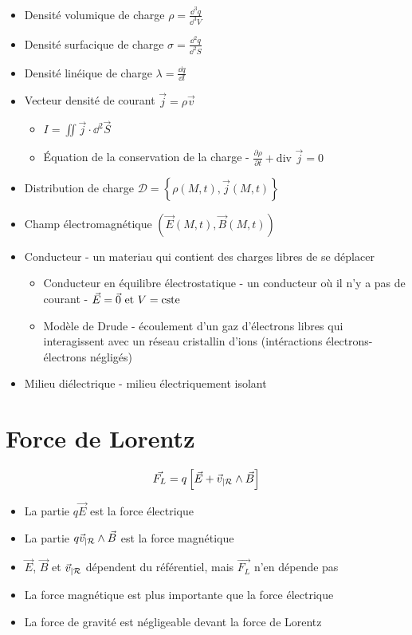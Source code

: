 \documentclass[openany]{book}
\begin{document}
\begin{itemize}
    \item Densité volumique de charge $\rho = \frac{\dd^3 q}{\dd^3 V}$
    \item Densité surfacique de charge $\sigma = \frac{\dd^2 q}{\dd^2 S}$
    \item Densité linéique de charge $\lambda = \frac{\dd q}{\dd l}$
    \item Vecteur densité de courant $\vec{j} = \rho \vec{v}$ 
    \begin{itemize}
        \item $I = \iint \vec{j} \cdot \dd^2 \vec{S}$
        \item Équation de la conservation de la charge - $\frac{\partial \rho}{\partial t} + \text{div }\vec{j} = 0$
    \end{itemize}
    \item Distribution de charge $\mathcal{D} = \left\{ \rho(M, t), \vec{j}(M, t) \right\}$
    \item Champ électromagnétique $\left( \vec{E}(M, t), \vec{B}(M, t) \right)$
    \item Conducteur - un materiau qui contient des charges libres de se déplacer
    \begin{itemize}
        \item Conducteur en équilibre électrostatique - un conducteur où il n'y a pas de courant - $\vec{E} = \vec{0} \text{ et } V = \text{cste}$
        \item Modèle de Drude - écoulement d'un gaz d'électrons libres qui interagissent avec un réseau cristallin d'ions (intéractions électrons-électrons négligés)
    \end{itemize}
    
    \item Milieu diélectrique - milieu électriquement isolant
\end{itemize}

\section{Force de Lorentz}
\[ \vec{F_L} = q\left[\vec{E} + \vec{v}_{|\mathcal{R}} \wedge \vec{B}\right] \]

\begin{itemize}
    \item La partie $q\vec{E}$ est la force électrique
    \item La partie $q\vec{v}_{|\mathcal{R}} \wedge \vec{B}$ est la force magnétique
    \item $\vec{E}$, $\vec{B}$ et $\vec{v}_{|\mathcal{R}}$ dépendent du référentiel, mais $\vec{F_L}$ n'en dépende pas
    \item La force magnétique est plus importante que la force électrique
    \item La force de gravité est négligeable devant la force de Lorentz
\end{itemize}
\end{document}
